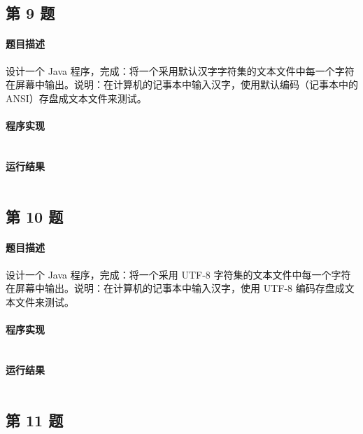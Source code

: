 \documentclass{academics}
\begin{document}
\subsection{第 9 题}

\paragraph{题目描述} {
    设计一个 Java 程序，完成：将一个采用默认汉字字符集的文本文件中每一个字符在屏幕中输出。说明：在计算机的记事本中输入汉字，使用默认编码（记事本中的 ANSI）存盘成文本文件来测试。
}

\paragraph{程序实现} {
    \inputminted[label=DefaultCharsetFile.java]{java}{../src/P09/DefaultCharsetFile.java}
}

\paragraph{运行结果} {
    \inputminted{text}{../res/P09.out}
}

\subsection{第 10 题}

\paragraph{题目描述} {
    设计一个 Java 程序，完成：将一个采用 UTF-8 字符集的文本文件中每一个字符在屏幕中输出。说明：在计算机的记事本中输入汉字，使用 UTF-8 编码存盘成文本文件来测试。
}

\paragraph{程序实现} {
    \inputminted[label=UTF8File.java]{java}{../src/P10/UTF8File.java}
}

\paragraph{运行结果} {
    \inputminted{text}{../res/P10.out}
}

\subsection{第 11 题}
\end{document}
